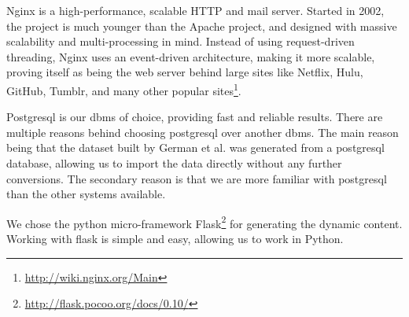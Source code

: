 \documentclass[conference, draftclsnofoot]{IEEEtran}
\begin{document}
Nginx is a high-performance, scalable HTTP and mail server. Started in 2002,
the project is much younger than the Apache project, and designed with massive
scalability and multi-processing in mind. Instead of using request-driven
threading, Nginx uses an event-driven architecture, making it more scalable,
proving itself as being the web server behind large sites like Netflix, Hulu,
GitHub, Tumblr, and many other popular
sites\footnote{\url{http://wiki.nginx.org/Main}}.

Postgresql is our dbms of choice, providing fast and reliable results. There
are multiple reasons behind choosing postgresql over another dbms. The main
reason being that the dataset built by German et al. was generated from
a postgresql database, allowing us to import the data directly without any
further conversions. The secondary reason is that we are more familiar with
postgresql than the other systems available.

We chose the python micro-framework
Flask\footnote{\url{http://flask.pocoo.org/docs/0.10/}} for generating the
dynamic content.  Working with flask is simple and easy, allowing us to work in
Python.
\end{document}
